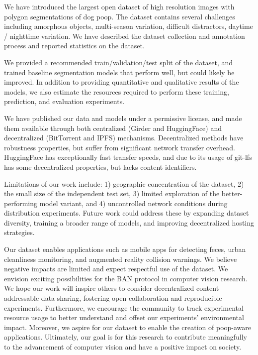 \documentclass{article}
\begin{document}
We have introduced the largest open dataset of high resolution images with polygon
  segmentations of dog poop.
The dataset contains several challenges including amorphous objects, multi-season variation, difficult
  distractors, daytime / nighttime variation.
We have described the dataset collection and annotation process and reported statistics on the dataset.

We provided a recommended train/validation/test split of the dataset, and trained baseline segmentation
  models that perform well, but could likely be improved.
In addition to providing quantitative and qualitative results of the models, we also estimate the resources
  required to perform these training, prediction, and evaluation experiments.

We have published our data and models under a permissive license, and made them available through both
  centralized (Girder and HuggingFace) and decentralized (BitTorrent and IPFS) mechanisms.
Decentralized methods have robustness properties, but suffer from significant network transfer overhead.
HuggingFace has exceptionally fast transfer speeds, and due to its usage of git-lfs has some decentralized
  properties, but lacks content identifiers.


Limitations of our work include:
1) geographic concentration of the dataset,
2) the small size of the independent test set,
3) limited exploration of the better-performing model variant, and
4) uncontrolled network conditions during distribution experiments.
Future work could address these by expanding dataset diversity, training a
broader range of models, and improving decentralized hosting strategies.

Our dataset enables applications such as mobile apps for detecting feces, urban
cleanliness monitoring, and augmented reality collision warnings. We believe
negative impacts are limited and expect respectful use of the dataset.
We envision exciting possibilities for the BAN protocol in computer vision research.
We hope our work will inspire others to consider decentralized content addressable data sharing, fostering
  open collaboration and reproducible experiments.
Furthermore, we encourage the community to track experimental resource usage to better understand and offset
  our experiments' environmental impact.
Moreover, we aspire for our dataset to enable the creation of poop-aware applications.
Ultimately, our goal is for this research to contribute meaningfully to the advancement of computer vision
  and have a positive impact on society.
  
\end{document}

